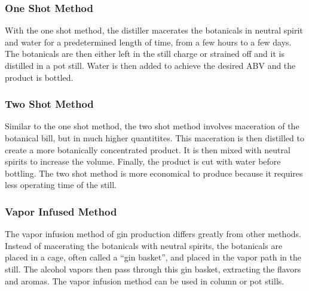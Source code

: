 \subsubsection{One Shot Method}
With the one shot method, the distiller macerates the botanicals in neutral
spirit and water for a predetermined length of time, from a few hours to a few
days. The botanicals are then either left in the still charge or strained off
and it is distilled in a pot still. Water is then added to achieve the desired
ABV and the product is bottled.

\subsubsection{Two Shot Method}
Similar to the one shot method, the two shot method involves maceration of the
botanical bill, but in much higher quantitites. This maceration is then
distilled to create a more botanically concentrated product. It is then mixed
with neutral spirits to increase the volume. Finally, the product is cut with
water before bottling. The two shot method is more economical to produce
because it requires less operating time of the still.

\subsubsection{Vapor Infused Method} 
The vapor infusion method of gin production differs greatly from other methods.
Instead of macerating the botanicals with neutral spirits, the botanicals are
placed in a cage, often called a ``gin basket'', and placed in the vapor path
in the still. The alcohol vapors then pass through this gin basket,
extracting the flavors and aromas. The vapor infusion method can be used in
column or pot stills.


